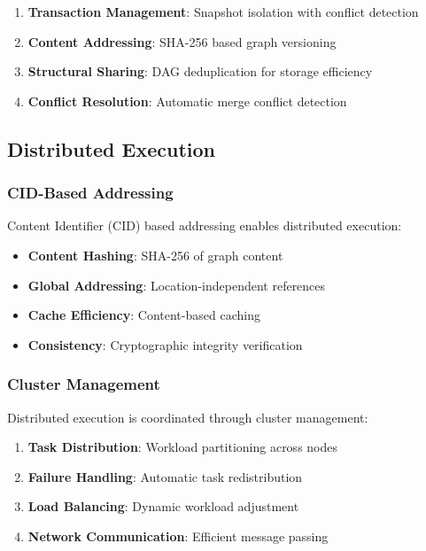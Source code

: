 \documentclass[11pt,a4paper]{article}
\begin{document}
\begin{enumerate}
\item \textbf{Transaction Management}: Snapshot isolation with conflict detection
\item \textbf{Content Addressing}: SHA-256 based graph versioning
\item \textbf{Structural Sharing}: DAG deduplication for storage efficiency
\item \textbf{Conflict Resolution}: Automatic merge conflict detection
\end{enumerate}

\subsection{Distributed Execution}
\label{subsec:distributed}

\subsubsection{CID-Based Addressing}
\label{subsubsec:cid_addressing}

Content Identifier (CID) based addressing enables distributed execution:

\begin{itemize}
\item \textbf{Content Hashing}: SHA-256 of graph content
\item \textbf{Global Addressing}: Location-independent references
\item \textbf{Cache Efficiency}: Content-based caching
\item \textbf{Consistency}: Cryptographic integrity verification
\end{itemize}

\subsubsection{Cluster Management}
\label{subsubsec:cluster_management}

Distributed execution is coordinated through cluster management:

\begin{enumerate}
\item \textbf{Task Distribution}: Workload partitioning across nodes
\item \textbf{Failure Handling}: Automatic task redistribution
\item \textbf{Load Balancing}: Dynamic workload adjustment
\item \textbf{Network Communication}: Efficient message passing
\end{enumerate}
\end{document}
